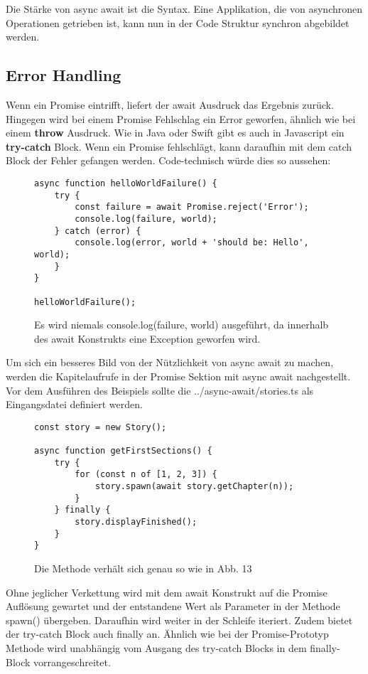 \noindent
Die Stärke von async await ist die Syntax. Eine Applikation, die von asynchronen Operationen getrieben ist, kann nun in der Code Struktur synchron abgebildet werden. 

\subsection{Error Handling}
Wenn ein Promise eintrifft, liefert der await Ausdruck das Ergebnis zurück. Hingegen wird bei einem Promise Fehlschlag ein Error geworfen, ähnlich wie bei einem \textbf{throw} Ausdruck. Wie in Java oder Swift gibt es auch in Javascript ein \textbf{try-catch} Block. Wenn ein Promise fehlschlägt, kann daraufhin mit dem catch Block der Fehler gefangen werden. Code-technisch würde dies so aussehen: 

\begin{figure}[H]
\begin{lstlisting}[basicstyle=\small]
async function helloWorldFailure() {
    try {
        const failure = await Promise.reject('Error');
        console.log(failure, world);
    } catch (error) {
        console.log(error, world + 'should be: Hello', world);
    }
}

helloWorldFailure();
\end{lstlisting}
\caption{Es wird niemals console.log(failure, world) ausgeführt, da innerhalb des await Konstrukts eine Exception geworfen wird.}
\end{figure}

\noindent
Um sich ein besseres Bild von der Nützlichkeit von async await zu machen, werden die Kapitelaufrufe in der Promise Sektion mit async await nachgestellt. Vor dem Ausführen des Beispiels sollte die ../async-await/stories.ts als Eingangsdatei definiert werden.


\begin{figure}[H]
\begin{lstlisting}[basicstyle=\small]
const story = new Story();

async function getFirstSections() {
    try {
        for (const n of [1, 2, 3]) {
            story.spawn(await story.getChapter(n));
        }
    } finally {
        story.displayFinished();
    }
}
\end{lstlisting}
\caption{Die Methode verhält sich genau so wie in Abb. 13}
\end{figure}

\noindent
Ohne jeglicher Verkettung wird mit dem await Konstrukt auf die Promise Auflösung gewartet und der entstandene Wert als Parameter in der Methode spawn() übergeben. Daraufhin wird weiter in der Schleife iteriert. Zudem bietet der try-catch Block auch finally an. Ähnlich wie bei der Promise-Prototyp Methode wird unabhängig vom Ausgang des try-catch Blocks in dem finally-Block vorrangeschreitet.

